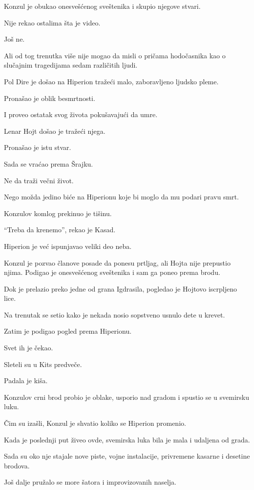 Konzul je obukao onesvešćenog sveštenika i skupio njegove stvari.

Nije rekao ostalima šta je video.

Još ne.

Ali od tog trenutka više nije mogao da misli o pričama hodočasnika kao o slučajnim tragedijama sedam različitih ljudi.

Pol Dire je došao na Hiperion tražeći malo, zaboravljeno ljudsko pleme.

Pronašao je oblik besmrtnosti.

I proveo ostatak svog života pokušavajući da umre.

Lenar Hojt došao je tražeći njega.

Pronašao je istu stvar.

Sada se vraćao prema Šrajku.

Ne da traži večni život.

Nego možda jedino biće na Hiperionu koje bi moglo da mu podari pravu smrt.

\bigskip

Konzulov komlog prekinuo je tišinu.

``Treba da krenemo'', rekao je Kasad.

Hiperion je već ispunjavao veliki deo neba.

Konzul je pozvao članove posade da ponesu prtljag, ali Hojta nije prepustio njima. Podigao je onesvešćenog sveštenika i sam ga poneo prema brodu.

Dok je prelazio preko jedne od grana Igdrasila, pogledao je Hojtovo iscrpljeno lice.

Na trenutak se setio kako je nekada nosio sopstveno usnulo dete u krevet.

Zatim je podigao pogled prema Hiperionu.

Svet ih je čekao.

\bigskip

Sleteli su u Kits predveče.

Padala je kiša.

Konzulov crni brod probio je oblake, usporio nad gradom i spustio se u svemirsku luku.

Čim su izašli, Konzul je shvatio koliko se Hiperion promenio.

Kada je poslednji put živeo ovde, svemirska luka bila je mala i udaljena od grada.

Sada su oko nje stajale nove piste, vojne instalacije, privremene kasarne i desetine brodova.

Još dalje pružalo se more šatora i improvizovanih naselja.

